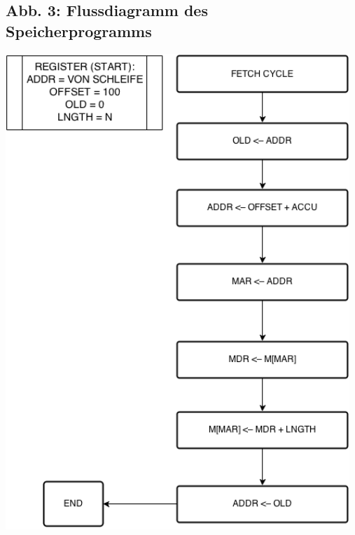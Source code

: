 \documentclass[12pt,titlepage]{article}
\begin{document}
\subsection{Abb. 3: Flussdiagramm des Speicherprogramms}
\includegraphics[width=13cm]{saveToHS.png}
\end{document}
